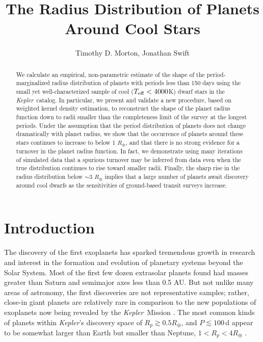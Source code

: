 \documentclass[iop]{emulateapj}
\def\Kepler{\textit{Kepler}}
\def\Rearth{R_\oplus}
\begin{document}
\title{The Radius Distribution of Planets Around Cool Stars}
\author{Timothy D. Morton, Jonathan Swift}


\begin{abstract}

We calculate an empirical, non-parametric estimate of the shape of the period-marginalized radius distribution of planets with periods less than 150 days using the small yet well-characterized sample of cool ($T_{\rm eff} <4000 $K) dwarf stars in the \Kepler\ catalog.  In particular, we present and validate a new procedure, based on weighted kernel density estimation, to reconstruct the shape of the planet radius function down to radii smaller than the completeness limit of the survey at the longest periods.  Under the assumption that the period distribution of planets does not change dramatically with planet radius, we show that the occurrence of planets around these stars continues to increase to below 1 $\Rearth$, and that there is no strong evidence for a turnover in the planet radius function. In fact, we demonstrate using many iterations of simulated data that a spurious turnover may be inferred from data even when the true distribution continues to rise toward smaller radii.  Finally, the sharp rise in the radius distribution below $\sim$3 $\Rearth$ implies that a large number of planets await discovery around cool dwarfs as the sensitivities of ground-based transit surveys increase.

\end{abstract}


\section{Introduction}

The discovery of the first exoplanets \citep{wol92,mayor1995,marcy1996} has sparked
tremendous growth in research and interest in the formation and
evolution of planetary systems beyond the Solar System. Most of the first few dozen extrasolar planets found had masses greater than Saturn and semimajor axes less than 0.5 AU. But not unlike
many areas of astronomy, the first discoveries are not representative
samples; rather, close-in giant planets are relatively rare
\citep{wright2012,howard2010} in comparison to the new populations of exoplanets now
being revealed by the \Kepler\ Mission \citep{borucki2011,batalha2012,burke2013}. The
most common kinds of planets within \Kepler's discovery space
of $R_p \gtrsim 0.5 \Rearth$, and $P \lesssim 100$\,d appear to
be somewhat larger than Earth but smaller than Neptune, $1 < R_p
<4 \Rearth$ \citep{howard2012,fressin2013,dressing2013}.
\end{document}
